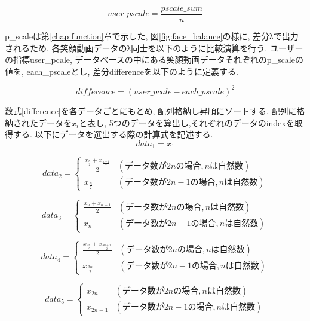 \begin{equation}
\label{userpscale}
user\_pscale= \frac{pscale\_sum}{n}
\end{equation}

p\_scaleは第\ref{chap:function}章で示した, 図\ref{fig:face_balance}の様に,
差分λで出力されるため, 各笑顔動画データのλ同士を以下のように比較演算を行う.
ユーザーの指標user\_pcale, データベースの中にある笑顔動画データそれぞれのp\_scaleの値を,
each\_pscaleとし, 差分differenceを以下のように定義する.

\begin{equation}
\label{difference}
difference =
\left(
user\_pcale - each\_pscale
\right)
^2
\end{equation}

数式\ref{difference}を各データごとにもとめ, 配列格納し昇順にソートする.
配列に格納されたデータを$x_i$と表し, 5つのデータを算出し,それぞれのデータのindexを取得する.
以下にデータを選出する際の計算式を記述する.
\begin{equation}
\label{data1}
data_1  = x_1
\end{equation}

\begin{equation}
\label{data2}
data_2 = \left\{ \begin{array}{ll}
\frac{x_{\frac{n}{2}} + x_{\frac{n+1}{2}} }{2} & (データ数が2nの場合,nは自然数) \\
x_{\frac{n}{2}} & (データ数が2n-1の場合,nは自然数)
\end{array} \right.\end{equation}

\begin{equation}
  \label{data3}
  data_3 = \left\{ \begin{array}{ll}
  \frac{x_n + x_{n+1} }{2} & (データ数が2nの場合,nは自然数) \\
  x_n & (データ数が2n-1の場合,nは自然数)
  \end{array} \right.\end{equation}

\begin{equation}
  \label{data4}
  data_4 = \left\{ \begin{array}{ll}
  \frac{x_{\frac{3n}{2}} + x_{\frac{3n+1}{2}} }{2} & (データ数が2nの場合,nは自然数) \\
  x_{\frac{3n}{2}} & (データ数が2n-1の場合,nは自然数)
  \end{array} \right.\end{equation}


\begin{equation}
  \label{data5}
  data_5  = \left\{ \begin{array}{ll}
  x_{2n} & (データ数が2nの場合,nは自然数) \\
  x_{2n-1} & (データ数が2n-1の場合,nは自然数)
  \end{array} \right.\end{equation}

